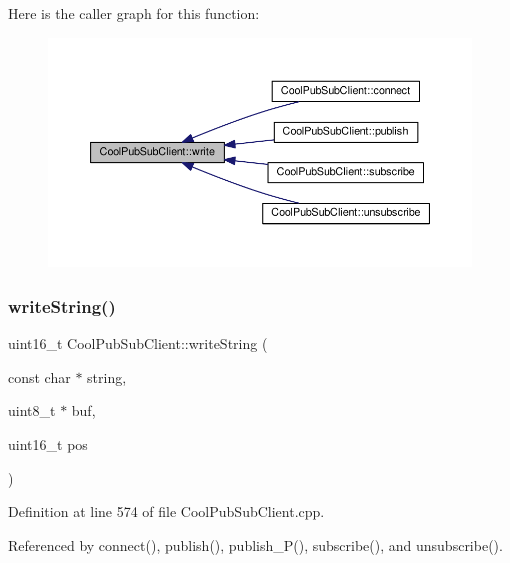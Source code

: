Here is the caller graph for this function\+:
\nopagebreak
\begin{figure}[H]
\begin{center}
\leavevmode
\includegraphics[width=350pt]{d8/d4b/class_cool_pub_sub_client_a7a8e4854a1846eaa668046d3854d47ad_icgraph}
\end{center}
\end{figure}
\mbox{\label{class_cool_pub_sub_client_a0e3d7e776d4cf4427f9569b28868905a}} 
\subsubsection{\texorpdfstring{write\+String()}{writeString()}}
{\footnotesize\ttfamily uint16\+\_\+t Cool\+Pub\+Sub\+Client\+::write\+String (\begin{DoxyParamCaption}\item[{const char $\ast$}]{string,  }\item[{uint8\+\_\+t $\ast$}]{buf,  }\item[{uint16\+\_\+t}]{pos }\end{DoxyParamCaption})\hspace{0.3cm}{\ttfamily [private]}}



Definition at line 574 of file Cool\+Pub\+Sub\+Client.\+cpp.



Referenced by connect(), publish(), publish\+\_\+\+P(), subscribe(), and unsubscribe().

